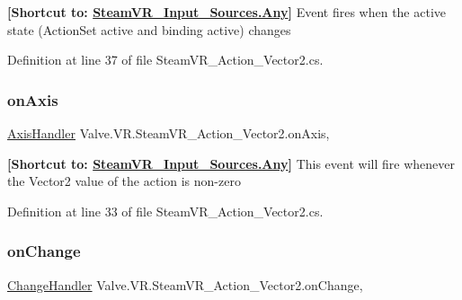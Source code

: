 {\bfseries{\mbox{[}Shortcut to\+: \mbox{\hyperlink{namespace_valve_1_1_v_r_a82e5bf501cc3aa155444ee3f0662853faed36a1ef76a59ee3f15180e0441188ad}{Steam\+V\+R\+\_\+\+Input\+\_\+\+Sources.\+Any}}\mbox{]}}} Event fires when the active state (Action\+Set active and binding active) changes 



Definition at line 37 of file Steam\+V\+R\+\_\+\+Action\+\_\+\+Vector2.\+cs.

\mbox{\label{class_valve_1_1_v_r_1_1_steam_v_r___action___vector2_a8572a98f22c7a84fdbeabb69b34580b2}} 
\subsubsection{\texorpdfstring{onAxis}{onAxis}}
{\footnotesize\ttfamily \mbox{\hyperlink{class_valve_1_1_v_r_1_1_steam_v_r___action___vector2_a11d8b99df804d185a33c7c60791ef426}{Axis\+Handler}} Valve.\+V\+R.\+Steam\+V\+R\+\_\+\+Action\+\_\+\+Vector2.\+on\+Axis\hspace{0.3cm}{\ttfamily [add]}, {\ttfamily [remove]}}



{\bfseries{\mbox{[}Shortcut to\+: \mbox{\hyperlink{namespace_valve_1_1_v_r_a82e5bf501cc3aa155444ee3f0662853faed36a1ef76a59ee3f15180e0441188ad}{Steam\+V\+R\+\_\+\+Input\+\_\+\+Sources.\+Any}}\mbox{]}}} This event will fire whenever the Vector2 value of the action is non-\/zero 



Definition at line 33 of file Steam\+V\+R\+\_\+\+Action\+\_\+\+Vector2.\+cs.

\mbox{\label{class_valve_1_1_v_r_1_1_steam_v_r___action___vector2_a339f6effe1596dd43a10ee68869f66e6}} 
\subsubsection{\texorpdfstring{onChange}{onChange}}
{\footnotesize\ttfamily \mbox{\hyperlink{class_valve_1_1_v_r_1_1_steam_v_r___action___vector2_ad390de62736aedd5be93238b1840ffec}{Change\+Handler}} Valve.\+V\+R.\+Steam\+V\+R\+\_\+\+Action\+\_\+\+Vector2.\+on\+Change\hspace{0.3cm}{\ttfamily [add]}, {\ttfamily [remove]}}



